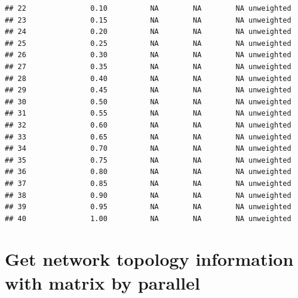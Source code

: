 \documentclass[
]{book}
\begin{document}
\begin{verbatim}
## 22               0.10          NA        NA        NA unweighted
## 23               0.15          NA        NA        NA unweighted
## 24               0.20          NA        NA        NA unweighted
## 25               0.25          NA        NA        NA unweighted
## 26               0.30          NA        NA        NA unweighted
## 27               0.35          NA        NA        NA unweighted
## 28               0.40          NA        NA        NA unweighted
## 29               0.45          NA        NA        NA unweighted
## 30               0.50          NA        NA        NA unweighted
## 31               0.55          NA        NA        NA unweighted
## 32               0.60          NA        NA        NA unweighted
## 33               0.65          NA        NA        NA unweighted
## 34               0.70          NA        NA        NA unweighted
## 35               0.75          NA        NA        NA unweighted
## 36               0.80          NA        NA        NA unweighted
## 37               0.85          NA        NA        NA unweighted
## 38               0.90          NA        NA        NA unweighted
## 39               0.95          NA        NA        NA unweighted
## 40               1.00          NA        NA        NA unweighted
\end{verbatim}

\section{Get network topology information with matrix by parallel}\label{get-network-topology-information-with-matrix-by-parallel}
\end{document}
